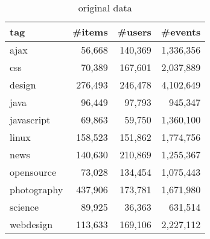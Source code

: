 \documentclass[dvipdfmx]{article}
\title{}
\date{}
\author{}
\begin{document}
\maketitle

\begin{table}[h]
\centering
\begin{tabular}{lrrr}
\hline
tag & \#items & \#users & \#events \\ \hline
ajax & 56,668 & 140,369 & 1,336,356 \\
css & 70,389 & 167,601 & 2,037,889 \\
design & 276,493 & 246,478 & 4,102,649 \\
java & 96,449 & 97,793 & 945,347 \\
javascript & 69,863 & 59,750 & 1,360,100 \\
linux & 158,523 & 151,862 & 1,774,756 \\
news & 140,630 & 210,869 & 1,255,367 \\
opensource & 73,028 & 134,454 & 1,075,443 \\
photography & 437,906 & 173,781 & 1,671,980 \\
science & 89,925 & 36,363 & 631,514 \\
webdesign & 113,633 & 169,106 & 2,227,112 \\
\hline
\end{tabular}
\caption{original data}
\end{table}
\end{document}
